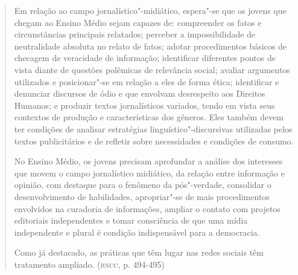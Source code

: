 \documentclass{extarticle}
\begin{document}
\begin{quote}
Em relação ao campo jornalístico"-midiático, espera"-se que os jovens
que chegam ao Ensino Médio sejam capazes de: compreender os fatos e
circunstâncias principais relatados; perceber a impossibilidade de
neutralidade absoluta no relato de fatos; adotar procedimentos básicos
de checagem de veracidade de informação; identificar diferentes pontos
de vista diante de questões polêmicas de relevância social; avaliar
argumentos utilizados e posicionar"-se em relação a eles de forma ética;
identificar e denunciar discursos de ódio e que envolvam desrespeito aos
Direitos Humanos; e produzir textos jornalísticos variados, tendo em
vista seus contextos de produção e características dos gêneros. Eles
também devem ter condições de analisar estratégias
linguístico"-discursivas utilizadas pelos textos publicitários e de
refletir sobre necessidades e condições de consumo.

No Ensino Médio, os jovens precisam aprofundar a análise dos interesses
que movem o campo jornalístico midiático, da relação entre informação e
opinião, com destaque para o fenômeno da pós"-verdade, consolidar o
desenvolvimento de habilidades, apropriar"-se de mais procedimentos
envolvidos na curadoria de informações, ampliar o contato com projetos
editoriais independentes e tomar consciência de que uma mídia
independente e plural é condição indispensável para a democracia.

Como já destacado, as práticas que têm lugar nas redes sociais têm
tratamento ampliado. (\textsc{bncc}, p. 494-495)
\end{quote}
\end{document}
